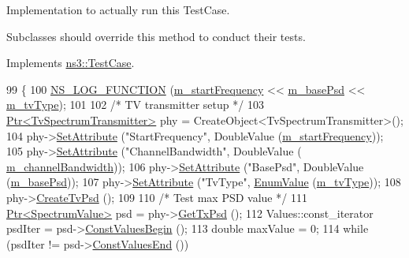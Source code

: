Implementation to actually run this Test\+Case. 

Subclasses should override this method to conduct their tests. 

Implements \hyperlink{classns3_1_1TestCase_a8ff74680cf017ed42011e4be51917a24}{ns3\+::\+Test\+Case}.


\begin{DoxyCode}
99 \{  
100   \hyperlink{log-macros-disabled_8h_a90b90d5bad1f39cb1b64923ea94c0761}{NS\_LOG\_FUNCTION} (\hyperlink{classTvSpectrumTransmitterTestCase_a2d6f826c11ed04d0b321853c18dd0092}{m\_startFrequency} << \hyperlink{classTvSpectrumTransmitterTestCase_a82db7da50d4e5f4087fa2dbf39d51582}{m\_basePsd} << 
      \hyperlink{classTvSpectrumTransmitterTestCase_a4f6d92198a3de6b3666f36b8692575f7}{m\_tvType});
101 
102   \textcolor{comment}{/* TV transmitter setup */}
103   \hyperlink{classns3_1_1Ptr}{Ptr<TvSpectrumTransmitter>} phy = CreateObject<TvSpectrumTransmitter>();
104   phy->\hyperlink{classns3_1_1ObjectBase_ac60245d3ea4123bbc9b1d391f1f6592f}{SetAttribute} (\textcolor{stringliteral}{"StartFrequency"}, DoubleValue (\hyperlink{classTvSpectrumTransmitterTestCase_a2d6f826c11ed04d0b321853c18dd0092}{m\_startFrequency}));
105   phy->\hyperlink{classns3_1_1ObjectBase_ac60245d3ea4123bbc9b1d391f1f6592f}{SetAttribute} (\textcolor{stringliteral}{"ChannelBandwidth"}, DoubleValue (
      \hyperlink{classTvSpectrumTransmitterTestCase_aeddf6b4a780ae52950c5f35ed50f3f94}{m\_channelBandwidth}));
106   phy->\hyperlink{classns3_1_1ObjectBase_ac60245d3ea4123bbc9b1d391f1f6592f}{SetAttribute} (\textcolor{stringliteral}{"BasePsd"}, DoubleValue (\hyperlink{classTvSpectrumTransmitterTestCase_a82db7da50d4e5f4087fa2dbf39d51582}{m\_basePsd})); 
107   phy->\hyperlink{classns3_1_1ObjectBase_ac60245d3ea4123bbc9b1d391f1f6592f}{SetAttribute} (\textcolor{stringliteral}{"TvType"}, \hyperlink{classns3_1_1EnumValue}{EnumValue} (\hyperlink{classTvSpectrumTransmitterTestCase_a4f6d92198a3de6b3666f36b8692575f7}{m\_tvType}));
108   phy->\hyperlink{classns3_1_1TvSpectrumTransmitter_a263590a58711ab359413eb0aeafbb261}{CreateTvPsd} ();
109 
110   \textcolor{comment}{/* Test max PSD value */}
111   \hyperlink{classns3_1_1Ptr}{Ptr<SpectrumValue>} psd = phy->\hyperlink{classns3_1_1TvSpectrumTransmitter_aef19a51b2de5fdb15d99e83c5af04af6}{GetTxPsd} ();
112   Values::const\_iterator psdIter = psd->\hyperlink{classns3_1_1SpectrumValue_aad6900431bd0554b3ba9a00691c2393b}{ConstValuesBegin} ();
113   \textcolor{keywordtype}{double} maxValue = 0;
114   \textcolor{keywordflow}{while} (psdIter != psd->\hyperlink{classns3_1_1SpectrumValue_ab5c2fbde4e06be7c0e4d7a0755c607be}{ConstValuesEnd} ())

\end{DoxyCode}
